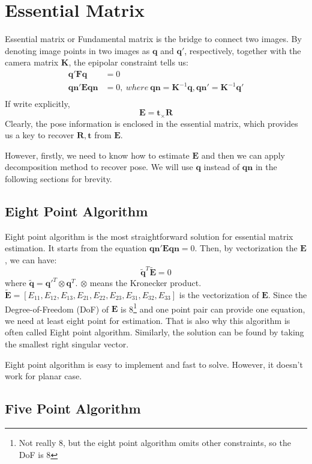 \documentclass[a4paper]{report}
\begin{document}
\section{Essential Matrix}
Essential matrix or Fundamental matrix is the bridge to connect two images. By denoting image points in two images as $\mathbf{q}$ and $\mathbf{q}'$, respectively, together with the camera matrix $\mathbf{K}$, the epipolar constraint tells us:
\begin{align*}
	\mathbf{q}'\mathbf{F}\mathbf{q}&=0 \\
	\mathbf{qn}'\mathbf{E}\mathbf{qn}&=0,\ where\ \mathbf{qn}=\mathbf{K}^{-1}\mathbf{q}, \mathbf{qn}' = \mathbf{K}^{-1}\mathbf{q}'\\
\end{align*}
If write explicitly, 
$$
\mathbf{E}=\mathbf{t}_{\times} \mathbf{R}
$$
Clearly, the pose information is enclosed in the essential matrix, which provides us a key to recover $\mathbf{R,t}$ from $\mathbf{E}$.

However, firstly, we need to know how to estimate $\mathbf{E}$ and then we can apply decomposition method to recover pose. We will use $\mathbf{q}$ instead of $\mathbf{qn}$ in the following sections for brevity.

\subsection{Eight Point Algorithm} 
Eight point algorithm is the most straightforward solution for essential matrix estimation. It starts from the equation $\mathbf{qn}'\mathbf{E}\mathbf{qn}=0$. Then, by vectorization the $\mathbf{E}$, we can have:
$$
\tilde{\mathbf{q}}^T\tilde{\mathbf{E}}=0
$$
where $\tilde{\mathbf{q}}=\mathbf{q}'^T \otimes \mathbf{q}^T$. $\otimes$ means the Kronecker product. $\tilde{\mathbf{E}}=[E_{11},E_{12},E_{13},E_{21},E_{22},E_{23},E_{31},E_{32},E_{33}]$ is the vectorization of $\mathbf{E}$. Since the Degree-of-Freedom (DoF) of $\mathbf{E}$ is 8\footnote{Not really 8, but the eight point algorithm omits other constraints, so the DoF is 8} and one point pair can provide one equation, we need at least eight point for estimation. That is also why this algorithm is often called Eight point algorithm. Similarly, the solution can be found by taking the smallest right singular vector. 

Eight point algorithm is easy to implement and fast to solve. However, it doesn't work for planar case.

\subsection{Five Point Algorithm}
\end{document}
